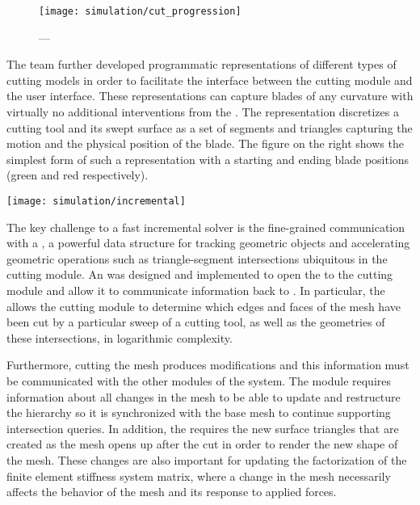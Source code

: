 \begin{figure}
  \centering%
  \texttt{[image: simulation/cut\_progression]}
  \caption{---}\label{fig:discontinuous_tetrahedra_solver}
\end{figure}

\begin{minipage}{0.6\linewidth}
The team further developed programmatic representations of different types of cutting models in order to facilitate the interface between the cutting module and the user interface. These representations can capture blades of any curvature with virtually no additional interventions from the . The representation discretizes a cutting tool and its swept surface as a set of segments and triangles capturing the motion and the physical position of the blade. The figure on the right shows the simplest form of such a representation with a starting and ending blade positions (green and red respectively).
\end{minipage}
\hfill%
\begin{minipage}{0.4\linewidth}
  \texttt{[image: simulation/incremental]}\label{fig:incremental}
\end{minipage}

The key challenge to a fast incremental solver is the fine-grained communication with a , a powerful data structure for tracking geometric objects and accelerating geometric operations such as triangle-segment intersections ubiquitous in the cutting module. An  was designed and implemented to open the  to the cutting module and allow it to communicate information back to . In particular, the   allows the cutting module to determine which edges and faces of the mesh have been cut by a particular sweep of a cutting tool, as well as the geometries of these intersections, in logarithmic complexity.

Furthermore, cutting the mesh produces modifications and this information must be communicated with the other modules of the system. The  module requires information about all changes in the mesh to be able to update and restructure the hierarchy so it is synchronized with the base mesh to continue supporting intersection queries. In addition, the  requires the new surface triangles that are created as the mesh opens up after the cut in order to render the new shape of the mesh. These changes are also important for updating the factorization of the finite element stiffness system matrix, where a change in the mesh necessarily affects the behavior of the mesh and its response to applied forces.

